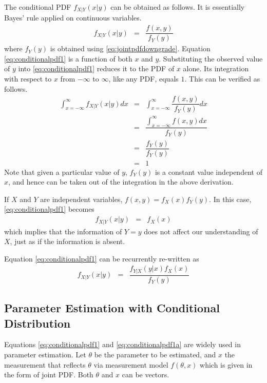 The conditional PDF $f_{X|Y}(x|y)$ can be obtained as follows. It is essentially Bayes' rule applied on continuous variables.
\begin{eqnarray}
  f_{X|Y}(x|y) &=& \dfrac{f(x, y)}{f_Y(y)} \label{eq:conditionalpdf1}
\end{eqnarray}
where $f_Y(y)$ is obtained using \eqref{eq:jointpdfdowngrade}. Equation \eqref{eq:conditionalpdf1} is a function of both $x$ and $y$. Substituting the observed value of $y$ into \eqref{eq:conditionalpdf1} reduces it to the PDF of $x$ alone. Its integration with respect to $x$ from $-\infty$ to $\infty$, like any PDF, equals $1$. This can be verified as follows.
\begin{eqnarray}
  \int_{x=-\infty}^{\infty}f_{X|Y}(x|y)dx &=& \int_{x=-\infty}^{\infty}\dfrac{f(x, y)}{f_Y(y)}dx \nonumber \\
  &=& \dfrac{\int_{x=-\infty}^{\infty}f(x, y)dx}{f_Y(y)} \nonumber \\
  &=& \dfrac{f_Y(y)}{f_Y(y)} \nonumber \\
  &=& 1 \nonumber
\end{eqnarray}
Note that given a particular value of $y$, $f_Y(y)$ is a constant value independent of $x$, and hence can be taken out of the integration in the above derivation.

If $X$ and $Y$ are independent variables, $f(x,y) = f_X(x)f_Y(y)$. In this case, \eqref{eq:conditionalpdf1} becomes
\begin{eqnarray}
  f_{X|Y}(x|y) &=& f_X(x) \nonumber
\end{eqnarray}
which implies that the information of $Y=y$ does not affect our understanding of $X$, just as if the information is absent.

Equation \eqref{eq:conditionalpdf1} can be recurrently re-written as
\begin{eqnarray}
f_{X|Y}(x|y) &=& \dfrac{f_{Y|X}(y|x)f_X(x)}{f_Y(y)} \label{eq:conditionalpdf1a}
\end{eqnarray}

\subsection{Parameter Estimation with Conditional Distribution}

Equations \eqref{eq:conditionalpdf1} and \eqref{eq:conditionalpdf1a} are widely used in parameter estimation. Let $\theta$ be the parameter to be estimated, and $x$ the measurement that reflects $\theta$ via measurement model $f(\theta, x)$ which is given in the form of joint PDF. Both $\theta$ and $x$ can be vectors.

